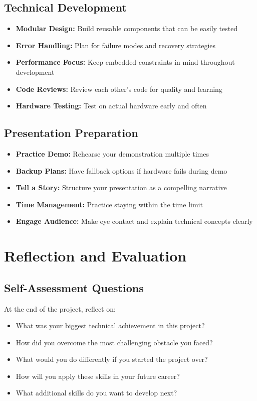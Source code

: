 \documentclass[11pt,a4paper]{article}
\begin{document}
\subsection{Technical Development}
\begin{itemize}
    \item \textbf{Modular Design:} Build reusable components that can be easily tested
    \item \textbf{Error Handling:} Plan for failure modes and recovery strategies
    \item \textbf{Performance Focus:} Keep embedded constraints in mind throughout development
    \item \textbf{Code Reviews:} Review each other's code for quality and learning
    \item \textbf{Hardware Testing:} Test on actual hardware early and often
\end{itemize}

\subsection{Presentation Preparation}
\begin{itemize}
    \item \textbf{Practice Demo:} Rehearse your demonstration multiple times
    \item \textbf{Backup Plans:} Have fallback options if hardware fails during demo
    \item \textbf{Tell a Story:} Structure your presentation as a compelling narrative
    \item \textbf{Time Management:} Practice staying within the time limit
    \item \textbf{Engage Audience:} Make eye contact and explain technical concepts clearly
\end{itemize}

\section{Reflection and Evaluation}

\subsection{Self-Assessment Questions}
At the end of the project, reflect on:
\begin{itemize}
    \item What was your biggest technical achievement in this project?
    \item How did you overcome the most challenging obstacle you faced?
    \item What would you do differently if you started the project over?
    \item How will you apply these skills in your future career?
    \item What additional skills do you want to develop next?
\end{itemize}
\end{document}
